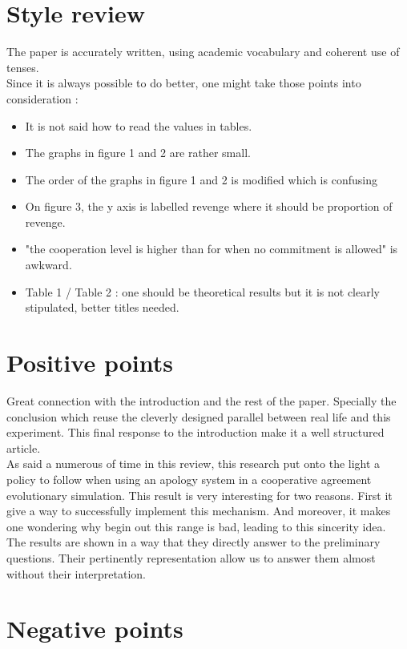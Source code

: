 \documentclass{article}
\begin{document}
\section{Style review}
The paper is accurately written, using academic vocabulary and coherent use of tenses.\\
Since it is always possible to do better, one might take those points into consideration :
\begin{itemize}
\item It is not said how to read the values in tables.
\item The graphs in figure 1 and 2 are rather small.
\item The order of the graphs in figure 1 and 2 is modified which is confusing
\item On figure 3, the y axis is labelled revenge where it should be proportion of revenge. 
\item "the cooperation level is higher than for when no commitment is allowed" is awkward.
\item Table 1 / Table 2 : one should be theoretical results but it is not clearly stipulated, better titles needed. 
\end{itemize}


\section{Positive points}

Great connection with the introduction and the rest of the paper. Specially the conclusion which reuse the cleverly designed parallel between real life and this experiment. This final response to the introduction make it a well structured article.\\

As said a numerous of time in this review, this research put onto the light a policy to follow when using an apology system in a cooperative agreement evolutionary simulation. This result is very interesting for two reasons. First it give a way to successfully implement this mechanism. And moreover, it makes one wondering why begin out this range is bad, leading to this sincerity idea.\\

The results are shown in a way that they directly answer to the preliminary questions. Their pertinently representation allow us to answer them almost without their interpretation.


\section{Negative points}
\end{document}
